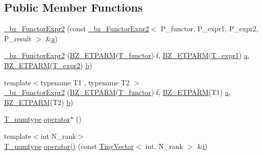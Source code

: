 \subsection*{Public Member Functions}
\begin{DoxyCompactItemize}
\item 
\hyperlink{class__bz__FunctorExpr2_ac5231acda9587c07d01ff4485449bea8}{\+\_\+bz\+\_\+\+Functor\+Expr2} (const \hyperlink{class__bz__FunctorExpr2}{\+\_\+bz\+\_\+\+Functor\+Expr2}$<$ P\+\_\+functor, P\+\_\+expr1, P\+\_\+expr2, P\+\_\+result $>$ \&\hyperlink{gen__mat5files_8m_aae328bf20413f220e38aec4d95bfd6da}{a})
\item 
\hyperlink{class__bz__FunctorExpr2_aaa7be6a60d860912e36fa9d907740348}{\+\_\+bz\+\_\+\+Functor\+Expr2} (\hyperlink{tuning_8h_a92a6f3aa8f4cd5ac9b4239c449892bb7}{B\+Z\+\_\+\+E\+T\+P\+A\+R\+M}(\hyperlink{class__bz__FunctorExpr2_a3fe23ec6c06a2346710d4590986bc1ae}{T\+\_\+functor}) f, \hyperlink{tuning_8h_a92a6f3aa8f4cd5ac9b4239c449892bb7}{B\+Z\+\_\+\+E\+T\+P\+A\+R\+M}(\hyperlink{class__bz__FunctorExpr2_ab18a816b647c4ec928bdd1b61646abfd}{T\+\_\+expr1}) \hyperlink{gen__mat5files_8m_aae328bf20413f220e38aec4d95bfd6da}{a}, \hyperlink{tuning_8h_a92a6f3aa8f4cd5ac9b4239c449892bb7}{B\+Z\+\_\+\+E\+T\+P\+A\+R\+M}(\hyperlink{class__bz__FunctorExpr2_af1371d32263c82261e4b24f3229af6ee}{T\+\_\+expr2}) \hyperlink{gen__mat5files_8m_a7b38767b3b6a8dae167e5afa4fc340b0}{b})
\item 
{\footnotesize template$<$typename T1 , typename T2 $>$ }\\\hyperlink{class__bz__FunctorExpr2_ae61a5d3fba0c16a38dae58e982333555}{\+\_\+bz\+\_\+\+Functor\+Expr2} (\hyperlink{tuning_8h_a92a6f3aa8f4cd5ac9b4239c449892bb7}{B\+Z\+\_\+\+E\+T\+P\+A\+R\+M}(\hyperlink{class__bz__FunctorExpr2_a3fe23ec6c06a2346710d4590986bc1ae}{T\+\_\+functor}) f, \hyperlink{tuning_8h_a92a6f3aa8f4cd5ac9b4239c449892bb7}{B\+Z\+\_\+\+E\+T\+P\+A\+R\+M}(T1) \hyperlink{gen__mat5files_8m_aae328bf20413f220e38aec4d95bfd6da}{a}, \hyperlink{tuning_8h_a92a6f3aa8f4cd5ac9b4239c449892bb7}{B\+Z\+\_\+\+E\+T\+P\+A\+R\+M}(T2) \hyperlink{gen__mat5files_8m_a7b38767b3b6a8dae167e5afa4fc340b0}{b})
\item 
\hyperlink{class__bz__FunctorExpr2_a72c49dc29bb54d045667666e72ea96a6}{T\+\_\+numtype} \hyperlink{class__bz__FunctorExpr2_a703b46f7c63711cf07442f2c98e75b02}{operator$\ast$} ()
\item 
{\footnotesize template$<$int N\+\_\+rank$>$ }\\\hyperlink{class__bz__FunctorExpr2_a72c49dc29bb54d045667666e72ea96a6}{T\+\_\+numtype} \hyperlink{class__bz__FunctorExpr2_ab4cd9d991f2ff46fc1ad16ff1c023953}{operator()} (const \hyperlink{classTinyVector}{Tiny\+Vector}$<$ int, N\+\_\+rank $>$ \&\hyperlink{indexexpr_8h_aabd77643995707c185e95c8cb2782c81}{i})

\end{DoxyCompactItemize}
